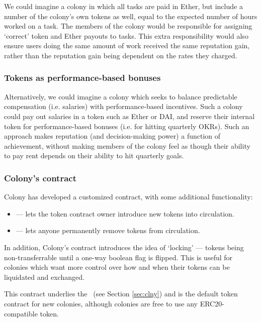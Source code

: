 We could imagine a colony in which all tasks are paid in Ether, but include a number of the colony's own tokens as well, equal to the expected number of hours worked on a task. The members of the colony would be responsible for assigning `correct' token and Ether payouts to tasks. This extra responsibility would also ensure users doing the same amount of work received the same reputation gain, rather than the reputation gain being dependent on the rates they charged.

\subsubsection*{Tokens as performance-based bonuses}

Alternatively, we could imagine a colony which seeks to balance predictable compensation (i.e. salaries) with performance-based incentives. Such a colony could pay out salaries in a token such as Ether or DAI, and reserve their internal token for performance-based bonuses (i.e. for hitting quarterly OKRs). Such an approach makes reputation (and decision-making power) a function of achievement, without making members of the colony feel as though their ability to pay rent depends on their ability to hit quarterly goals.

\subsubsection{Colony's  contract}

Colony has developed a customized  contract, with some additional functionality:

\begin{itemize}
	\item {} --- lets the token contract owner introduce new tokens into circulation.
	\item {} --- lets anyone permanently remove tokens from circulation.
\end{itemize}

In addition, Colony's  contract introduces the idea of `locking' --- tokens being non-transferrable until a one-way boolean flag is flipped. This is useful for colonies which want more control over how and when their tokens can be liquidated and exchanged.

This contract underlies the \rct\ (see Section \ref{sec:clny}) and is the default token contract for new colonies, although colonies are free to use any ERC20-compatible token.

